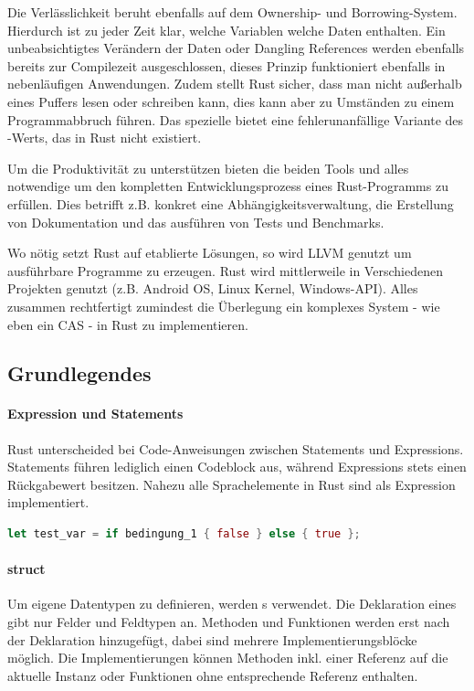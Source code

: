 \documentclass[11pt,a4paper, ngerman]{article}
\begin{document}
Die Verlässlichkeit beruht ebenfalls auf dem Ownership- und Borrowing-System. Hierdurch ist zu jeder Zeit klar, welche Variablen welche Daten enthalten. Ein unbeabsichtigtes Verändern der Daten oder Dangling References werden ebenfalls bereits zur Compilezeit ausgeschlossen, dieses Prinzip funktioniert ebenfalls in nebenläufigen Anwendungen. Zudem stellt Rust sicher, dass man nicht außerhalb eines Puffers lesen oder schreiben kann, dies kann aber zu Umständen zu einem Programmabbruch führen. Das spezielle   bietet eine fehlerunanfällige Variante des -Werts, das in Rust nicht existiert.

Um die Produktivität zu unterstützen bieten die beiden Tools  und  alles notwendige um den kompletten Entwicklungsprozess eines Rust-Programms zu erfüllen. Dies betrifft z.B. konkret eine Abhängigkeitsverwaltung, die Erstellung von Dokumentation und das ausführen von Tests und Benchmarks.

Wo nötig setzt Rust auf etablierte Lösungen, so wird LLVM genutzt um ausführbare Programme zu erzeugen. Rust wird mittlerweile in Verschiedenen Projekten genutzt (z.B. Android OS, Linux Kernel, Windows-API). Alles zusammen rechtfertigt zumindest die Überlegung ein komplexes System - wie eben ein CAS - in Rust zu implementieren.

\subsection{Grundlegendes}
\paragraph{Expression und Statements} Rust unterscheided bei Code-Anweisungen zwischen Statements und Expressions. Statements führen lediglich einen Codeblock aus, während Expressions stets einen Rückgabewert besitzen. Nahezu alle Sprachelemente in Rust sind als Expression implementiert.

\begin{lstlisting}[language=rust, caption={Expression Einführendes Beispiel}]
    let test_var = if bedingung_1 { false } else { true };
\end{lstlisting}

\paragraph{struct} Um eigene Datentypen zu definieren, werden s verwendet. Die Deklaration eines  gibt nur Felder und Feldtypen an. Methoden und Funktionen werden erst nach der Deklaration hinzugefügt, dabei sind mehrere Implementierungsblöcke möglich. Die Implementierungen können Methoden inkl. einer Referenz auf die aktuelle Instanz oder Funktionen ohne entsprechende Referenz enthalten.
\end{document}
